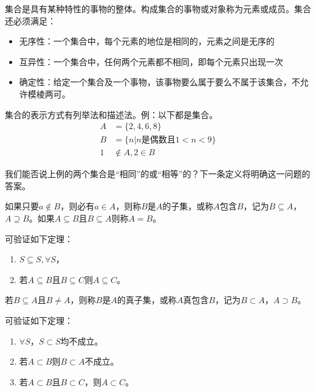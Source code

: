 \documentclass[main.tex]{subfiles}
\begin{document}
\begin{definition}[集合]
集合是具有某种特性的事物的整体。构成集合的事物或对象称为元素或成员。集合还必须满足：
\begin{itemize}
    \item 无序性：一个集合中，每个元素的地位是相同的，元素之间是无序的
    \item 互异性：一个集合中，任何两个元素都不相同，即每个元素只出现一次
    \item 确定性：给定一个集合及一个事物，该事物要么属于要么不属于该集合，不允许模棱两可。
\end{itemize}
\end{definition}

集合的表示方式有列举法和描述法。例：以下都是集合。
\begin{align*}
    A&=\{2,4,6,8\}\\
    B&=\{n|n\text{是偶数且}1<n<9\}\\
    1&\notin A, 2\in B
\end{align*}

我们能否说上例的两个集合是“相同”的或“相等”的？下一条定义将明确这一问题的答案。

\begin{definition}
如果只要\(a\notin B\)，则必有\(a\in A\)，则称$B$是$A$的子集，或称$A$包含$B$，记为\(B\subseteq A\)，\(A\supseteq B\)。如果\(A\subseteq B\)且\(B\subseteq A\)则称\(A=B\)。
\end{definition}

可验证如下定理：

\begin{theorem}
\begin{enumerate}
\item \(S\subseteq S, \forall S\)，
\item 若\(A\subseteq B\)且\(B\subseteq C\)则\(A\subseteq C\)。
\end{enumerate}
\end{theorem}

\begin{definition}[子集]
若\(B\subseteq A\)且\(B\neq A\)，则称$B$是$A$的真子集，或称$A$真包含$B$，记为\(B\subset A\)，\(A\supset B\)。
\end{definition}

可验证如下定理：
\begin{theorem}
\begin{enumerate}
    \item $\forall S$，$S\subset S$均不成立。
    \item 若$A\subset B$则$B\subset A$不成立。
    \item 若$A\subset B$且$B\subset C$，则$A\subset C$。
\end{enumerate}
\end{theorem}
\end{document}

